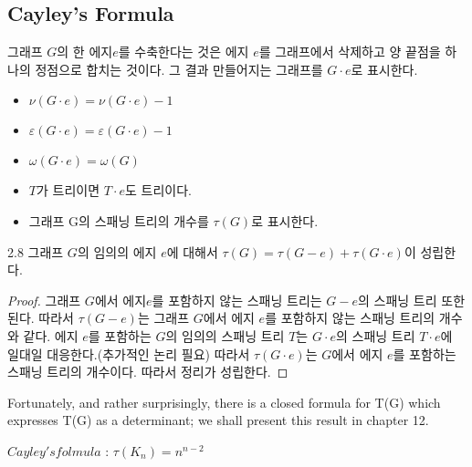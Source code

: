 \subsection{Cayley's Formula}
\begin{dfn}[contract]
    그래프 $G$의 한 에지$e$를 수축한다는 것은 에지 $e$를 그래프에서 삭제하고 양 끝점을 하나의 정점으로 합치는 것이다. 그 결과 만들어지는 그래프를 $G \cdot e$로 표시한다.
    \begin{itemize}
        \item $\nu(G \cdot e) = \nu(G \cdot e) - 1$
        \item $\varepsilon(G \cdot e) = \varepsilon(G \cdot e)-1$
        \item $\omega(G \cdot e) = \omega(G)$
        \item  $T$가 트리이면 $T \cdot e$도 트리이다.
        \item 그래프 G의 스패닝 트리의 개수를 $\tau(G)$로 표시한다.
    \end{itemize}
\end{dfn}

\begin{theorem}
    2.8 그래프 $G$의 임의의 에지 $e$에 대해서 $\tau(G) =\tau(G-e) + \tau(G \cdot e)$이 성립한다.
\end{theorem}

\begin{proof}
    그래프 $G$에서 에지$e$를 포함하지 않는 스패닝 트리는 $G-e$의 스패닝 트리 또한 된다.
    따라서 $\tau(G-e)$는 그래프 $G$에서 에지 $e$를 포함하지 않는 스패닝 트리의 개수와 같다.
    에지 $e$를 포함하는 $G$의 임의의 스패닝 트리 $T$는 $G \cdot e$의 스패닝 트리 $T \cdot e$에 일대일 대응한다.(추가적인 논리 필요) 따라서 $\tau(G \cdot e)$는 $G$에서 에지 $e$를 포함하는 스패닝 트리의 개수이다. 따라서 정리가 성립한다.
\end{proof}


Fortunately, and rather surprisingly, there is a closed formula for T(G) which expresses T(G) as a determinant; 
we shall present this result in chapter 12.


\begin{theorem}
    $Cayley's folmula$ : $\tau(K_n)= n^{n-2}$
\end{theorem}

